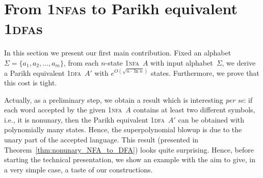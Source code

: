 \documentclass[11pt]{article}
\newcommand*{\ow}{\textsc{1}}
\newcommand*{\owdfa}{\ow\textsc{dfa}}
\newcommand*{\ownfa}{\ow\textsc{nfa}}
\begin{document}
\section{From \mbox{\sc\ownfa}s to Parikh equivalent \mbox{\sc\owdfa}s}
	\label{sec:NFA_to_DFA}


In this section we present our first main contribution.
Fixed an alphabet~$\Sigma = \{a_1, a_2, \ldots, a_m\}$,
{}from each $n$-state \ownfa~$A$ with input alphabet~$\Sigma$, we derive a Parikh equivalent \owdfa\ $A'$ 
with $e^{O(\sqrt{n \cdot \ln n})}$
states. Furthermore, we prove that this cost is tight.

Actually, as a preliminary step, we obtain a result which is interesting \emph{per se}:
if each word accepted by the given \ownfa~$A$ contains at least two different symbols, i.e., it is
nonunary, then the Parikh equivalent \owdfa~$A'$ can be obtained with polynomially many states.
Hence, the superpolynomial blowup is due to the unary part of the accepted language.
This result (presented in Theorem~\ref{thm:nonunary_NFA_to_DFA}) looks quite
surprising. Hence, before starting the technical presentation,
we show an example with the aim to give, in a very simple case, a taste of our constructions.
\end{document}
